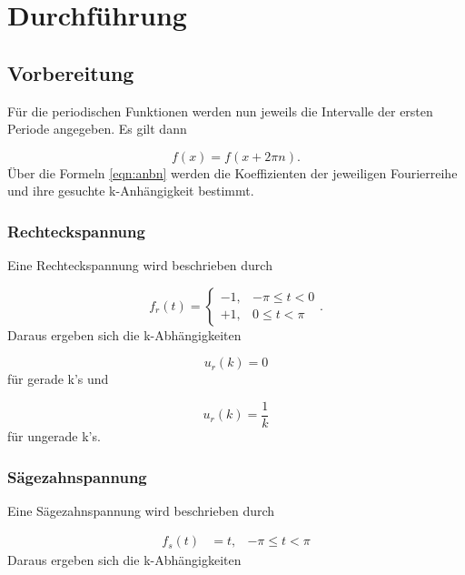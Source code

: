  \section{Durchführung}
\label{sec:Durchführung}

\subsection{Vorbereitung}
\label{sec:Vorbereitung}

Für die periodischen Funktionen werden nun jeweils die Intervalle der ersten
Periode angegeben. Es gilt dann

\begin{equation}
  f(x) = f(x+2\pi n).
\end{equation}
Über die Formeln \eqref{eqn:anbn} werden
die Koeffizienten der jeweiligen Fourierreihe und ihre gesuchte
k-Anhängigkeit bestimmt.

\subsubsection{Rechteckspannung}

Eine Rechteckspannung wird beschrieben durch

\begin{equation}
  f_r(t) =
  \begin{cases}
    -1, & -\pi \leq t < 0 \\
    +1, & 0 \leq t < \pi
  \end{cases}.
\end{equation}
Daraus ergeben sich die k-Abhängigkeiten

\begin{equation}
  u_r(k) = 0
\end{equation}
für gerade k's und

\begin{equation}
  u_r(k) = \frac{1}{k}
\end{equation}
für ungerade k's.

\subsubsection{Sägezahnspannung}

Eine Sägezahnspannung wird beschrieben durch

\begin{align}
  f_s(t) & = t, & -\pi \leq t < \pi
\end{align}
Daraus ergeben sich die k-Abhängigkeiten

